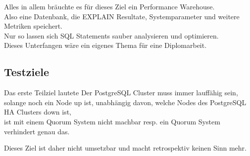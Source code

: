 \begin{flushleft}
    Alles in allem bräuchte es für dieses Ziel ein Performance Warehouse.\\
    Also eine Datenbank, die EXPLAIN Resultate, Systemparameter und weitere Metriken speichert.\\
    Nur so lassen sich SQL Statements sauber analysieren und optimieren.\\
    Dieses Unterfangen wäre ein eigenes Thema für eine Diplomarbeit.
    \subsection{Testziele}
    Das erste Teilziel lautete \guillemotleft Der PostgreSQL Cluster muss immer lauffähig sein, solange noch ein Node up ist, unabhängig davon, welche Nodes des PostgreSQL HA Clusters down ist\guillemotright,\\
    ist mit einem \Gls{Quorum} System nicht machbar resp. ein \Gls{Quorum} System verhindert genau das.
\end{flushleft}
\begin{flushleft}
    Dieses Ziel ist daher nicht umsetzbar und macht retrospektiv keinen Sinn mehr.
\end{flushleft}